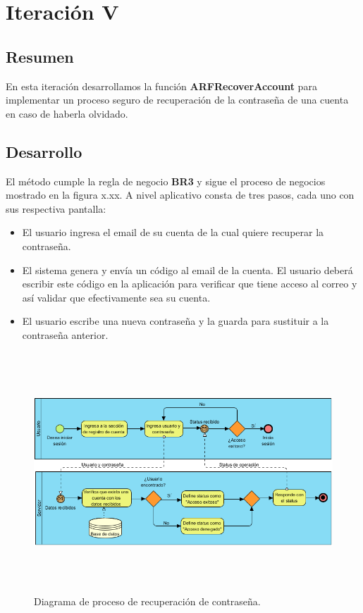 \section{Iteración V}
\subsection{Resumen}
En esta iteración desarrollamos la función \textbf{ARFRecoverAccount} para implementar un proceso seguro de recuperación de la contraseña de una cuenta en caso de haberla olvidado.

\subsection{Desarrollo}
El método cumple la regla de negocio \textbf{BR3} y sigue el proceso de negocios mostrado en la figura x.xx. A nivel aplicativo consta de tres pasos, cada uno con sus respectiva pantalla:
\begin{itemize}
	\item El usuario ingresa el email de su cuenta de la cual quiere recuperar la contraseña.
	\item El sistema genera y envía un código al email de la cuenta. El usuario deberá escribir este código en la aplicación para verificar que tiene acceso al correo y así validar que efectivamente sea su cuenta.
	\item El usuario escribe una nueva contraseña y la guarda para sustituir a la contraseña anterior.
\end{itemize}
\begin{figure}[h!]
	\centering
	\includegraphics[width=15cm,height=9cm]{imagenes/desarrollo/diagramas/BPMN_LOGIN.png}
	\caption{Diagrama de proceso de recuperación de contraseña.}
	\label{fig:recover}
\end{figure}
